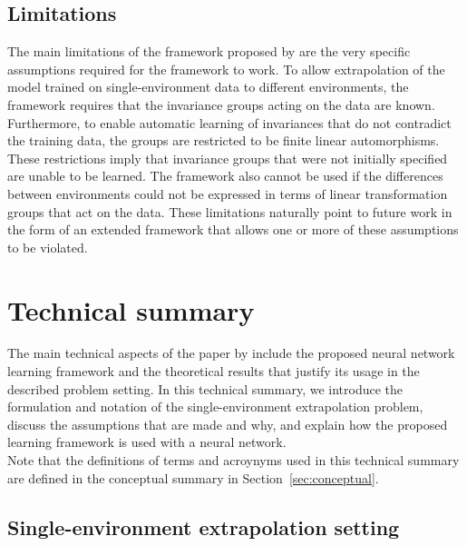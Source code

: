  
\subsection{Limitations}

The main limitations of the framework proposed by \textcite{Mouli:2021} are the very specific assumptions required for the framework to work. To allow extrapolation of the model trained on single-environment data to different environments, the framework requires that the invariance groups acting on the data are known. Furthermore, to enable automatic learning of invariances that do not contradict the training data, the groups are restricted to be finite linear automorphisms. These restrictions imply that invariance groups that were not initially specified are unable to be learned. The framework also cannot be used if the differences between environments could not be expressed in terms of linear transformation groups that act on the data. These limitations naturally point to future work in the form of an extended framework that allows one or more of these assumptions to be violated.



\newpage



\section{Technical summary}

The main technical aspects of the paper by \textcite{Mouli:2021} include the proposed neural network learning framework and the theoretical results that justify its usage in the described problem setting. In this technical summary, we introduce the formulation and notation of the single-environment extrapolation problem, discuss the assumptions that are made and why, and explain how the proposed learning framework is used with a neural network.
\\

Note that the definitions of terms and acroynyms used in this technical summary are defined in the conceptual summary in Section~\ref{sec:conceptual}.


\subsection{Single-environment extrapolation setting}

